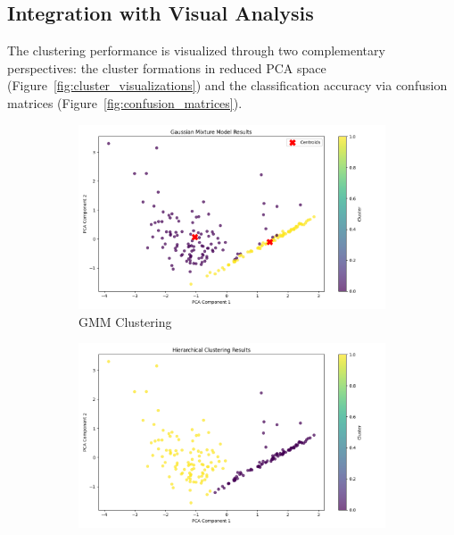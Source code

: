 \documentclass[a4paper,12pt]{report}
\begin{document}
\subsection{Integration with Visual Analysis}

The clustering performance is visualized through two complementary perspectives: the cluster formations in reduced PCA space (Figure~\ref{fig:cluster_visualizations}) and the classification accuracy via confusion matrices (Figure~\ref{fig:confusion_matrices}).

\begin{figure}[H]
    \centering
    \begin{subfigure}[b]{0.32\textwidth}
        \centering
        \includegraphics[width=\textwidth]{images/clustering/gmm_clustering.png}
        \caption{GMM Clustering}
        \label{fig:gmm_cluster}
    \end{subfigure}
    \hfill
    \begin{subfigure}[b]{0.32\textwidth}
        \centering
        \includegraphics[width=\textwidth]{images/clustering/hierarchical_clustering.png}

\end{subfigure}
\end{figure}
\end{document}
